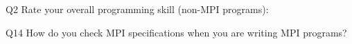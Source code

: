 \begin{description}%
\item{Q2} Rate your overall programming skill (non-MPI programs):%
\item{Q14} How do you check MPI specifications when you are writing MPI programs?%
\end{description}%
